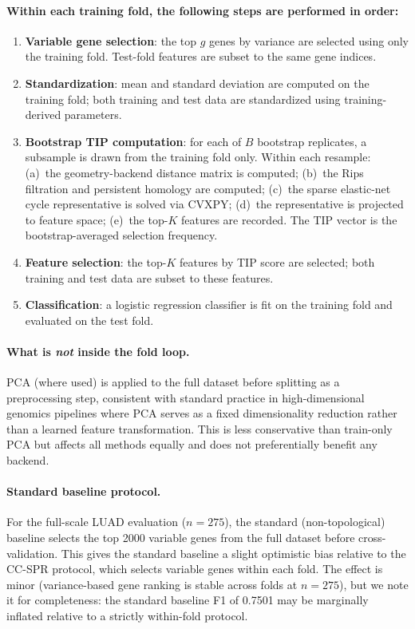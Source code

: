 \documentclass[11pt]{article}
\begin{document}
\paragraph{Within each training fold, the following steps are performed in order:}
\begin{enumerate}[leftmargin=1.5em]
\item \textbf{Variable gene selection}: the top $g$ genes by variance are selected using only the training fold.
Test-fold features are subset to the same gene indices.
\item \textbf{Standardization}: mean and standard deviation are computed on the training fold; both training and test data are standardized using training-derived parameters.
\item \textbf{Bootstrap TIP computation}: for each of $B$ bootstrap replicates, a subsample is drawn from the training fold only. Within each resample:
  (a)~the geometry-backend distance matrix is computed;
  (b)~the Rips filtration and persistent homology are computed;
  (c)~the sparse elastic-net cycle representative is solved via CVXPY;
  (d)~the representative is projected to feature space;
  (e)~the top-$K$ features are recorded.
  The TIP vector is the bootstrap-averaged selection frequency.
\item \textbf{Feature selection}: the top-$K$ features by TIP score are selected; both training and test data are subset to these features.
\item \textbf{Classification}: a logistic regression classifier is fit on the training fold and evaluated on the test fold.
\end{enumerate}

\paragraph{What is \emph{not} inside the fold loop.}
PCA (where used) is applied to the full dataset before splitting as a preprocessing step, consistent with standard practice in high-dimensional genomics pipelines where PCA serves as a fixed dimensionality reduction rather than a learned feature transformation.
This is less conservative than train-only PCA but affects all methods equally and does not preferentially benefit any backend.

\paragraph{Standard baseline protocol.}
For the full-scale LUAD evaluation ($n = 275$), the standard (non-topological) baseline selects the top 2000 variable genes from the full dataset before cross-validation.
This gives the standard baseline a slight optimistic bias relative to the CC-SPR protocol, which selects variable genes within each fold.
The effect is minor (variance-based gene ranking is stable across folds at $n = 275$), but we note it for completeness: the standard baseline F1 of 0.7501 may be marginally inflated relative to a strictly within-fold protocol.
\end{document}
